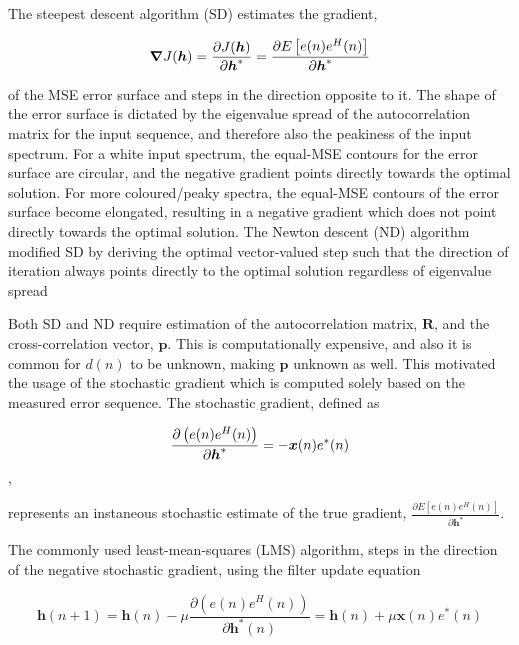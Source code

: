 The steepest descent algorithm (SD) estimates the gradient,

\begin{equation}
	\boldsymbol{\nabla} J(\boldsymbol{h}) = 
	\frac{\partial J(\boldsymbol{h})}{\partial \boldsymbol{h}^*} = \frac{\partial E\left[e(n)e^H(n)\right]}{\partial \boldsymbol{h}^*} \\
\end{equation}


\noindent
of the MSE error surface and steps in the direction opposite to it. The shape of the error surface is dictated by the eigenvalue spread of the autocorrelation matrix for the input sequence, and therefore also the peakiness of the input spectrum. For a white input spectrum, the equal-MSE contours for the error surface are circular, and the negative gradient points directly towards the optimal solution. For more coloured/peaky spectra, the equal-MSE contours of the error surface become elongated, resulting in a negative gradient which does not point directly towards the optimal solution. The Newton descent (ND) algorithm modified SD by deriving the optimal vector-valued step such that the direction of iteration always points directly to the optimal solution regardless of eigenvalue spread

Both SD and ND require estimation of the autocorrelation matrix, $\boldsymbol{R}$, and the cross-correlation vector, $\boldsymbol{p}$. This is computationally expensive, and also it is common for $d(n)$ to be unknown, making $\boldsymbol{p}$ unknown as well. This motivated the usage of the stochastic gradient which is computed solely based on the measured error sequence. The stochastic gradient, defined as

\begin{equation}
	\frac{\partial \left(e(n)e^H(n)\right)}{\partial \boldsymbol{h}^*} = - \boldsymbol{x}(n)e^*(n) \\
\end{equation},

\noindent
represents an instaneous stochastic estimate of the true gradient, $ \frac{\partial E\left[e(n)e^H(n)\right]}{\partial \boldsymbol{h}^*} $.

The commonly used least-mean-squares (LMS) algorithm, steps in the direction of the negative stochastic gradient, using the filter update equation

\begin{equation}
	\boldsymbol{h}(n+1) =
	 \boldsymbol{h}(n) - \mu 	\frac{\partial \left(e(n)e^H(n)\right)}{\partial \boldsymbol{h}^*(n)} =
	 \boldsymbol{h}(n) + \mu \boldsymbol{x}(n)e^*(n)
\end{equation}

